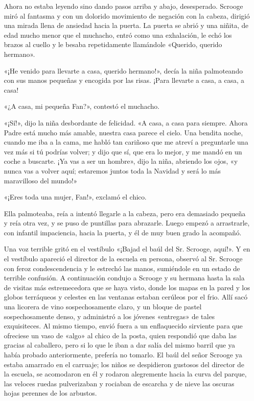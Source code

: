\documentclass{novela}
\begin{document}
 Ahora no estaba leyendo sino dando pasos arriba y abajo, desesperado. Scrooge miró al fantasma y con un dolorido movimiento de negación con la cabeza, dirigió una mirada llena de ansiedad hacia la puerta. La puerta se abrió y una niñita, de edad mucho menor que el muchacho, entró como una exhalación, le echó los brazos al cuello y le besaba repetidamente llamándole «Querido, querido hermano».

 «¡He venido para llevarte a casa, querido hermano!», decía la niña palmoteando con sus manos pequeñas y encogida por las risas. ¡Para llevarte a casa, a casa, a casa!

 «¿A casa, mi pequeña Fan?», contestó el muchacho.

 «¡Sí!», dijo la niña desbordante de felicidad. «A casa, a casa para siempre. Ahora Padre está mucho más amable, nuestra casa parece el cielo. Una bendita noche, cuando me iba a la cama, me habló tan cariñoso que me atreví a preguntarle una vez más si tú podrías volver; y dijo que sí, que era lo mejor, y me mandó en un coche a buscarte. ¡Ya vas a ser un hombre», dijo la niña, abriendo los ojos, «y nunca vas a volver aquí; estaremos juntos toda la Navidad y será lo más maravilloso del mundo!»

 «¡Eres toda una mujer, Fan!», exclamó el chico.

 Ella palmoteaba, reía a intentó llegarle a la cabeza, pero era demasiado pequeña y reía otra vez, y se puso de puntillas para abrazarle. Luego empezó a arrastrarle, con infantil impaciencia, hacia la puerta, y él de muy buen grado la acompañó.

 Una voz terrible gritó en el vestíbulo «¡Bajad el baúl del Sr. Scrooge, aquí!». Y en el vestíbulo apareció el director de la escuela en persona, observó al Sr. Scrooge con feroz condescendencia y le estrechó las manos, sumiéndole en un estado de terrible confusión. A continuación condujo a Scrooge y su hermana hasta la sala de visitas más estremecedora que se haya visto, donde los mapas en la pared y los globos terráqueos y celestes en las ventanas estaban cerúleos por el frio. Allí sacó una licorera de vino sospechosamente claro, y un bloque de pastel sospechosamente denso, y administró a los jóvenes «entregas» de tales exquisiteces. Al mismo tiempo, envió fuera a un enflaquecido sirviente para que ofreciese un vaso de «algo» al chico de la posta, quien respondió que daba las gracias al caballero, pero si lo que le iban a dar salía del mismo barril que ya había probado anteriormente, prefería no tomarlo. El baúl del señor Scrooge ya estaba amarrado en el carruaje; los niños se despidieron gustosos del director de la escuela, se acomodaron en él y rodaron alegremente hacia la curva del parque, las veloces ruedas pulverizaban y rociaban de escarcha y de nieve las oscuras hojas perennes de los arbustos.
\end{document}
